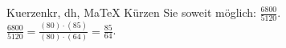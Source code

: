 \begin{MAufgabe}{Kuerzen}{kr, dh, MaTeX}
K\"urzen Sie soweit m\"oglich: $\frac{6800}{5120}$.\\ 
\ifLsg\MLoesung
\quad $\frac{6800}{5120}=\frac{(80)\cdot(85)}{(80)\cdot(64)}=\frac{85}{64}$.\else\relax\fi
 \end{MAufgabe}
